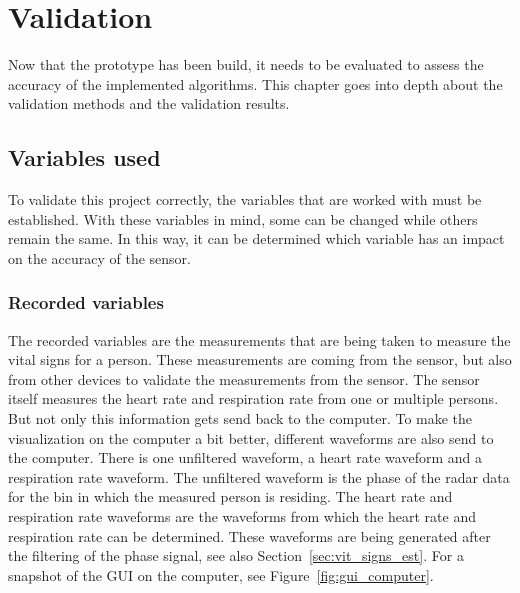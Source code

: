 \chapter{Validation}
\label{chp:validation}

Now that the prototype has been build, it needs to be evaluated to assess the accuracy of the implemented algorithms. This chapter goes into depth about the validation methods and the validation results.

\section{Variables used}
To validate this project correctly, the variables that are worked with must be established. With these variables in mind, some can be changed while others remain the same. In this way, it can be determined which variable has an impact on the accuracy of the sensor. 

\subsection{Recorded variables}
The recorded variables are the measurements that are being taken to measure the vital signs for a person. These measurements are coming from the sensor, but also from other devices to validate the measurements from the sensor. The sensor itself measures the heart rate and respiration rate from one or multiple persons. But not only this information gets send back to the computer. To make the visualization on the computer a bit better, different waveforms are also send to the computer. There is one unfiltered waveform, a heart rate waveform and a respiration rate waveform. The unfiltered waveform is the phase of the radar data for the bin in which the measured person is residing. The heart rate and respiration rate waveforms are the waveforms from which the heart rate and respiration rate can be determined. These waveforms are being generated after the filtering of the phase signal, see also Section~\ref{sec:vit_signs_est}. For a snapshot of the GUI on the computer, see Figure~\ref{fig:gui_computer}.

